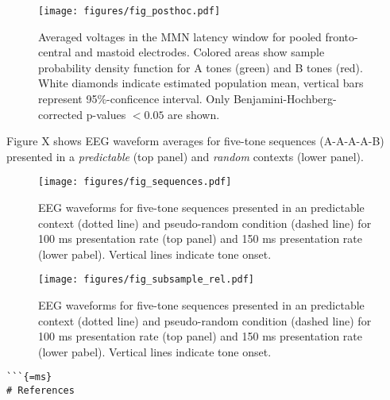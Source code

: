 \documentclass[stu,a4paper,11pt,floatsintext]{apa7}
\renewcommand{\includegraphics}[1]{
	\latexincludegraphics[width = \textwidth]{#1}
}
\begin{document}
\begin{figure}
\centering
\texttt{[image: figures/fig\_posthoc.pdf]}
\caption{Averaged voltages in the MMN latency window for pooled
fronto-central and mastoid electrodes. Colored areas show sample
probability density function for A tones (green) and B tones (red).
White diamonds indicate estimated population mean, vertical bars
represent 95\%-conficence interval. Only Benjamini-Hochberg-corrected
p-values \(< 0.05\) are shown.}
\end{figure}

Figure X shows EEG waveform averages for five-tone sequences (A-A-A-A-B)
presented in a \emph{predictable} (top panel) and \emph{random} contexts
(lower panel).

\begin{figure}
\centering
\texttt{[image: figures/fig\_sequences.pdf]}
\caption{EEG waveforms for five-tone sequences presented in an
predictable context (dotted line) and pseudo-random condition (dashed
line) for 100 ms presentation rate (top panel) and 150 ms presentation
rate (lower pabel). Vertical lines indicate tone onset.}
\end{figure}

\begin{figure}
\centering
\texttt{[image: figures/fig\_subsample\_rel.pdf]}
\caption{EEG waveforms for five-tone sequences presented in an
predictable context (dotted line) and pseudo-random condition (dashed
line) for 100 ms presentation rate (top panel) and 150 ms presentation
rate (lower pabel). Vertical lines indicate tone onset.}
\end{figure}

\newpage

\begin{verbatim}
```{=ms}
# References
\end{verbatim}
\end{document}
